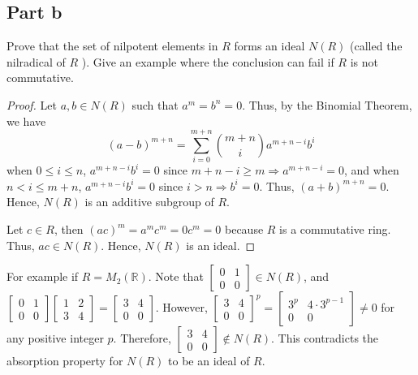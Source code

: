\subsection{Part b}

\begin{question}
    Prove that the set of nilpotent elements in $R$ forms an ideal $N(R)$ (called the nilradical of $R$ ). Give an example where the conclusion can fail if $R$ is not commutative.
\end{question}

\begin{answer}
    \begin{proof}
        Let $a,b \in N(R)$ such that $a^m = b^n = 0$. Thus, by the Binomial Theorem, we have
        $$(a-b)^{m+n}=\sum_{i = 0}^{m+n} {m+n \choose i}a^{m+n-i}b^{i}$$
        when $0 \leq i \leq n$, $a^{m+n-i}b^{i} = 0$ since $m+n-i \geq m \Rightarrow a^{m+n-i} = 0$, and when $n < i \leq m+n$, $a^{m+n-i}b^{i} = 0$ since $i > n \Rightarrow b^i = 0$. Thus, $(a+b)^{m+n} = 0$. Hence, $N(R)$ is an additive subgroup of $R$. 
        
        Let $c \in R$, then $(ac)^m = a^mc^m = 0c^m = 0$ because $R$ is a commutative ring. Thus, $ac \in N(R)$. Hence, $N(R)$ is an ideal.
    \end{proof}
    For example if $R = M_2(\mathbb{R})$. Note that $[\begin{smallmatrix}0 & 1\\ 0 & 0\end{smallmatrix}] \in N(R)$, and $[\begin{smallmatrix}0 & 1\\ 0 & 0\end{smallmatrix}][\begin{smallmatrix}1 & 2\\ 3 & 4\end{smallmatrix}] = [\begin{smallmatrix}3 & 4\\ 0 & 0\end{smallmatrix}]$. However, $[\begin{smallmatrix}3 & 4\\ 0 & 0\end{smallmatrix}]^p = [\begin{smallmatrix}3^p & 4\cdot 3^{p-1}\\ 0 & 0\end{smallmatrix}] \neq 0$ for any positive integer $p$. Therefore, $[\begin{smallmatrix}3 & 4\\ 0 & 0\end{smallmatrix}] \notin N(R)$. This contradicts the absorption property for $N(R)$ to be an ideal of $R$.
\end{answer}

